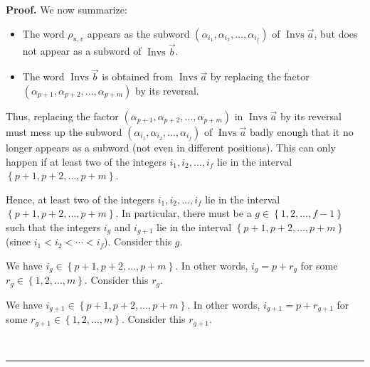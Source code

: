 \documentclass
[numbers=enddot,12pt,final,onecolumn,notitlepage,abstracton]{scrartcl}%
\theoremstyle{definition}
\newenvironment{proof}[1][Proof]{\noindent\textbf{#1.} }{\ \rule{0.5em}{0.5em}}
\begin{document}
\begin{proof}
We now summarize:

\begin{itemize}
\item The word $\rho_{u,v}$ appears as the subword $\left(  \alpha_{i_{1}%
},\alpha_{i_{2}},\ldots,\alpha_{i_{f}}\right)  $ of $\operatorname*{Invs}%
\overrightarrow{a}$, but does not appear as a subword of $\operatorname*{Invs}%
\overrightarrow{b}$.

\item The word $\operatorname*{Invs}\overrightarrow{b}$ is obtained from
$\operatorname*{Invs}\overrightarrow{a}$ by replacing the factor
\newline$\left(  \alpha_{p+1},\alpha_{p+2},\ldots,\alpha_{p+m}\right)  $ by
its reversal.
\end{itemize}

Thus, replacing the factor $\left(  \alpha_{p+1},\alpha_{p+2},\ldots
,\alpha_{p+m}\right)  $ in $\operatorname*{Invs}\overrightarrow{a}$ by its
reversal must mess up the subword $\left(  \alpha_{i_{1}},\alpha_{i_{2}%
},\ldots,\alpha_{i_{f}}\right)  $ of $\operatorname*{Invs}\overrightarrow{a}$
badly enough that it no longer appears as a subword (not even in different
positions). This can only happen if at least two of the integers $i_{1}%
,i_{2},\ldots,i_{f}$ lie in the interval $\left\{  p+1,p+2,\ldots,p+m\right\}
$.

Hence, at least two of the integers $i_{1},i_{2},\ldots,i_{f}$ lie in the
interval $\left\{  p+1,p+2,\ldots,p+m\right\}  $. In particular, there must be
a $g\in\left\{  1,2,\ldots,f-1\right\}  $ such that the integers $i_{g}$ and
$i_{g+1}$ lie in the interval $\left\{  p+1,p+2,\ldots,p+m\right\}  $ (since
$i_{1}<i_{2}<\cdots<i_{f}$). Consider this $g$.

We have $i_{g}\in\left\{  p+1,p+2,\ldots,p+m\right\}  $. In other words,
$i_{g}=p+r_{g}$ for some $r_{g}\in\left\{  1,2,\ldots,m\right\}  $. Consider
this $r_{g}$.

We have $i_{g+1}\in\left\{  p+1,p+2,\ldots,p+m\right\}  $. In other words,
$i_{g+1}=p+r_{g+1}$ for some $r_{g+1}\in\left\{  1,2,\ldots,m\right\}  $.
Consider this $r_{g+1}$.


\end{proof}
\end{document}
